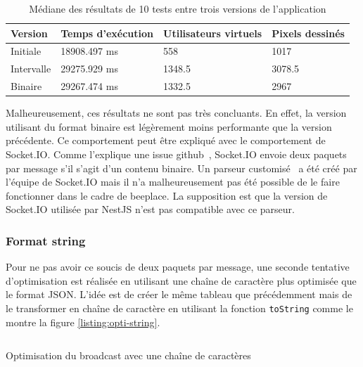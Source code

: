\begin{table}[H]
  \centering
  \begin{tabular}{|l|l|l|l|}
    \hline
    \textbf{Version} & \textbf{Temps d'exécution} & \textbf{Utilisateurs virtuels} & \textbf{Pixels dessinés} \\ \hline
    Initiale         & 18908.497 ms               & 558                            & 1017                     \\ \hline
    Intervalle       & 29275.929 ms               & 1348.5                         & 3078.5                   \\ \hline
    Binaire          & 29267.474 ms               & 1332.5                         & 2967                     \\ \hline
  \end{tabular}
  \caption{Médiane des résultats de 10 tests entre trois versions de l'application}
  \label{table:second-opti-results}
\end{table}

Malheureusement, ces résultats ne sont pas très concluants. En effet, la version utilisant du format binaire est légèrement moins performante que la version précédente. Ce comportement peut être expliqué avec le comportement de Socket.IO. Comme l'explique une issue \gls{github}~\cite{socket-io-binary-issue}, Socket.IO envoie deux paquets par message s'il s'agit d'un contenu binaire. Un parseur customisé~\cite{socket-io-msgpack-parser} a été créé par l'équipe de Socket.IO mais il n'a malheureusement pas été possible de le faire fonctionner dans le cadre de \gls{beeplace}. La supposition est que la version de Socket.IO utilisée par NestJS n'est pas compatible avec ce parseur.

\subsubsection{Format string}

Pour ne pas avoir ce soucis de deux paquets par message, une seconde tentative d'optimisation est réalisée en utilisant une chaîne de caractère plus optimisée que le format JSON. L'idée est de créer le même tableau que précédemment mais de le transformer en chaîne de caractère en utilisant la fonction \texttt{toString} comme le montre la figure \ref{listing:opti-string}.

\begin{listing}[H]
  \inputminted[highlightlines={5,6}]{ts}{assets/figures/opti-string.ts}
  \caption{Optimisation du broadcast avec une chaîne de caractères}
  \label{listing:opti-string}
\end{listing}


